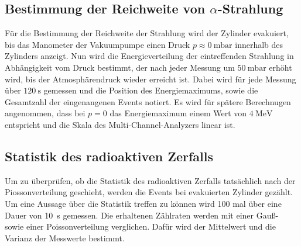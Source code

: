 \subsection{Bestimmung der Reichweite von \texorpdfstring{$\alpha$}{alpha}-Strahlung}
Für die Bestimmung der Reichweite der Strahlung wird der Zylinder evakuiert, bis das Manometer der Vakuumpumpe einen Druck $p \approx \SI{0}{\milli\bar}$ innerhalb des Zylinders anzeigt.
Nun wird die Energieverteilung der eintreffenden Strahlung in Abhängigkeit vom Druck bestimmt, der nach jeder Messung um $\SI{50}{\milli\bar}$ erhöht wird, bis der Atmosphärendruck wieder erreicht ist.
Dabei wird für jede Messung über $\SI{120}{\second}$ gemessen und die Position des Energiemaximums, sowie die Gesamtzahl der eingenangenen Events notiert. Es wird für spätere Berechnugen angenommen, dass 
bei $p=0$ das Energiemaximum einem Wert von $\SI{4}{\mega\electronvolt}$ entspricht und die 
Skala des Multi-Channel-Analyzers linear ist.
\subsection{Statistik des radioaktiven Zerfalls}
Um zu überprüfen, ob die Statistik des radioaktiven Zerfalls tatsächlich nach der Piossonverteilung geschieht, werden die Events bei evakuierten Zylinder gezählt.
Um eine Aussage über die Statistik treffen zu können wird \num{100} mal über eine Dauer von \SI{10}{\second} gemessen. Die erhaltenen Zählraten werden mit einer Gauß- sowie einer Poissonverteilung 
verglichen. Dafür wird der Mittelwert und die Varianz der Messwerte bestimmt.
